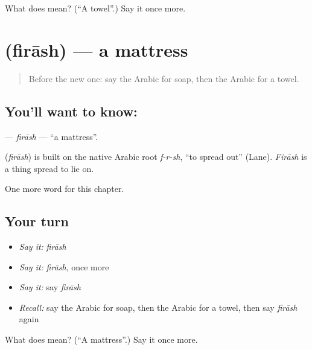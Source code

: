 \begin{tcolorbox}[breakable,colback=teal!4,colframe=teal!35!black,title={Before you move on}]
What does  mean? (\textquotedblleft{}A towel\textquotedblright{}.) Say it once more.
\end{tcolorbox}
\section[\texorpdfstring{\ar{فراش} (firāsh)}{فراش (firāsh)}]{ (firāsh) — a mattress}

\label{lesson:AR-C122-firash}



\begin{quote}
Before the new one: say the Arabic for soap, then the Arabic for a towel.
\end{quote}

\subsection*{You'll want to know: }
\textbf{} — \emph{firāsh} — \textquotedblleft{}a mattress\textquotedblright{}.

\begin{cousinweb}
\textbf{} (\emph{firāsh}) is built on the native Arabic root \emph{f-r-sh}, \textquotedblleft{}to spread out\textquotedblright{} (Lane). \emph{Firāsh} is a thing spread to lie on.
\end{cousinweb}

\begin{grammarlens}[title={What you've built}]
One more word for this chapter.
\end{grammarlens}

\subsection*{Your turn}
\begin{itemize}
\raggedright
  \item \emph{Say it:} \emph{firāsh}
  \item \emph{Say it:} \emph{firāsh}, once more
  \item \emph{Say it:} say \emph{firāsh}
  \item \emph{Recall:} say the Arabic for soap, then the Arabic for a towel, then say \emph{firāsh} again
\end{itemize}

\begin{tcolorbox}[breakable,colback=teal!4,colframe=teal!35!black,title={Before you move on}]
What does  mean? (\textquotedblleft{}A mattress\textquotedblright{}.) Say it once more.
\end{tcolorbox}
